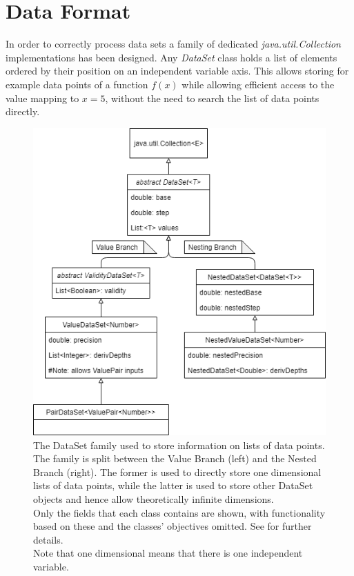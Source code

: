 \documentclass[main.tex]{subfiles}
\begin{document}
  
  \section{Data Format}
    \label{sec:impl:data}
    
    In order to correctly process data sets a family of dedicated \textit{java.util.Collection} implementations has been designed. Any \textit{DataSet} class holds a list of elements ordered by their position on an independent variable axis. This allows storing for example data points of a function $f(x)$ while allowing efficient access to the value mapping to $x=5$, without the need to search the list of data points directly.
    
    \begin{figure}
      \centering
      \includegraphics[width=0.55\linewidth]{figures/dataSetFamily}
      \captionsetup{format=plain, indention=1.0cm}
      \caption{The DataSet family used to store information on lists of data points. The family is split between the Value Branch (left) and the Nested Branch (right). The former is used to directly store one dimensional lists of data points, while the latter is used to store other DataSet objects and hence allow theoretically infinite dimensions. \\
      Only the fields that each class contains are shown, with functionality based on these and the classes' objectives omitted. See  for further details. \\
      Note that one dimensional means that there is one independent variable.}
      \label{fig:dataSetFam}
    \end{figure}
    
\end{document}
